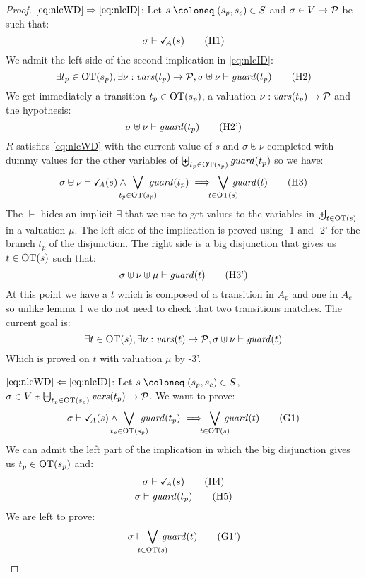 \documentclass{article}
\begin{document}
\begin{proof}
\item[\(\eqref{eq:nlcWD}\Rightarrow\eqref{eq:nlcID}\):]
	Let \(s \defobject \mpar{s_p, s_c} \in S\) and \(\sigma \in V \to \mathcal{P}\) be such that:
	\[ \sigma \vdash \reach{A}\mpar{s} \hyp{1} \]
	We admit the left side of the second implication in \eqref{eq:nlcID}:
	\[ \exists t_p \in \fOT{s_p}, \exists \nu: \fvars{t_p} \to \values, \sigma \uplus \nu \vdash \fguard{t_p} \hyp{2} \]
	We get immediately a transition \(t_p \in \mathrm{OT}{\left(s_p\right)}\), a valuation \(\nu: \mathit{vars}{\left(t_p\right)} \to \mathcal{P}\) and the hypothesis:
	\[ \sigma \uplus \nu \vdash \fguard{t_p} \hyp{2'} \]
	\(R\) satisfies \eqref{eq:nlcWD} with the current value of \(s\) and \(\sigma \uplus \nu\) completed with dummy values for the other variables of \(\biguplus_{t_p \in \mathrm{OT}{\left(s_p\right)}} \mathit{guard}{\left(t_p\right)}\) so we have:
	\[ \sigma \uplus \nu \vdash \reach{A}\mpar{s} \wedge \bigvee_\subbox{t_p \in \fOT{s_p}} \fguard{t_p} \implies \bigvee_\subbox{t \in \fOT{s}} \fguard{t} \hyp{3} \]
	The \(\vdash\) hides an implicit \(\exists\) that we use to get values to the variables in \(\biguplus_{t \in \mathrm{OT}{\left(s\right)}}\) in a valuation \(\mu\).
	The left side of the implication is proved using \hyp{1} and \hyp{2'} for the branch \(t_p\) of the disjunction.
	The right side is a big disjunction that gives us \(t \in \mathrm{OT}{\left(s\right)}\) such that:
	\[ \sigma \uplus \nu \uplus \mu \vdash \fguard{t} \hyp{3'} \]
	At this point we have a \(t\) which is composed of a transition in \(A_p\) and one in \(A_c\) so unlike lemma 1 we do not need to check that two transitions matches.
	The current goal is:
	\[ \exists t \in \mathrm{OT}{\left(s\right)}, \exists \nu: \mathit{vars}{\left(t\right)} \to \mathcal{P}, \sigma \uplus \nu \vdash \mathit{guard}{\left(t\right)} \]
	Which is proved on \(t\) with valuation \(\mu\) by \hyp{3'}.
\item[\(\eqref{eq:nlcWD}\Leftarrow\eqref{eq:nlcID}\):]
	Let \(s \defobject \mpar{s_p, s_c} \in S\), \(\sigma \in V \uplus \biguplus_{t_p \in \mathrm{OT}{\left(s_p\right)}} \mathit{vars}{\left(t_p\right)} \to \mathcal{P}\).
	We want to prove:
	\[ \sigma \vdash \reach{A}\mpar{s} \wedge \bigvee_\subbox{t_p \in \fOT{s_p}} \fguard{t_p} \implies \bigvee_\subbox{t \in \fOT{s}} \fguard{t} \goal{1} \]
	We can admit the left part of the implication in which the big disjunction gives us \(t_p \in \mathrm{OT}{\left(s_p\right)}\) and:\\
	\begin{gather}
		\sigma \vdash \reach{A}\mpar{s} \hyp{4} \\
		\sigma \vdash \fguard{t_p} \hyp{5}
	\end{gather}
	We are left to prove:
	\[ \sigma \vdash \bigvee_\subbox{t \in \fOT{s}} \fguard{t} \goal{1'} \]

\end{proof}
\end{document}
